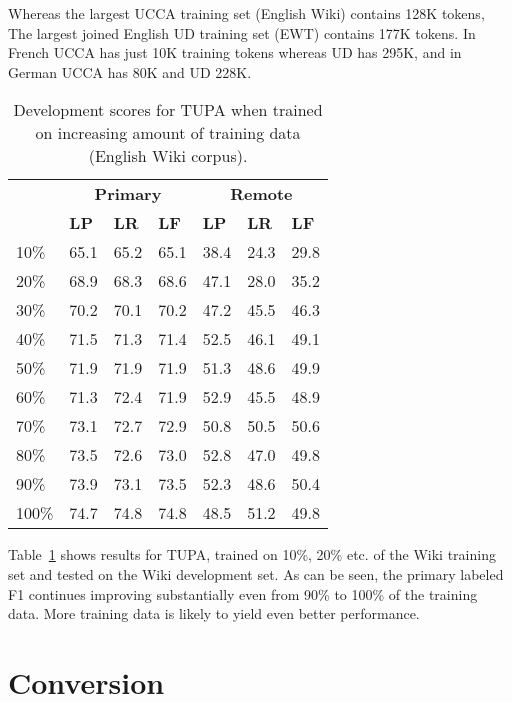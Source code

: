 \documentclass[11pt,a4paper]{article}
\begin{document}
Whereas the largest UCCA training set (English Wiki) contains 128K tokens,
The largest joined English UD training set (EWT) contains 177K tokens.
In French UCCA has just 10K training tokens whereas UD has 295K,
and in German UCCA has 80K and UD 228K.

\begin{table}[t]
\centering
\begin{tabular}{l|lll|lll}
& \multicolumn{3}{c|}{\footnotesize \bf Primary} & \multicolumn{3}{c}{\footnotesize \bf Remote} \\
& \footnotesize \textbf{LP} & \footnotesize \textbf{LR} & \footnotesize \textbf{LF}
& \footnotesize \textbf{LP} & \footnotesize \textbf{LR} & \footnotesize \textbf{LF} \\
\hline
\footnotesize 10\% & 65.1 & 65.2 & 65.1 & 38.4 & 24.3 & 29.8\\
\footnotesize 20\% & 68.9 & 68.3 & 68.6 & 47.1 & 28.0 & 35.2\\
\footnotesize 30\% & 70.2 & 70.1 & 70.2 & 47.2 & 45.5 & 46.3\\
\footnotesize 40\% & 71.5 & 71.3 & 71.4 & 52.5 & 46.1 & 49.1\\
\footnotesize 50\% & 71.9 & 71.9 & 71.9 & 51.3 & 48.6 & 49.9\\
\footnotesize 60\% & 71.3 & 72.4 & 71.9 & 52.9 & 45.5 & 48.9\\
\footnotesize 70\% & 73.1 & 72.7 & 72.9 & 50.8 & 50.5 & 50.6\\
\footnotesize 80\% & 73.5 & 72.6 & 73.0 & 52.8 & 47.0 & 49.8\\
\footnotesize 90\% & 73.9 & 73.1 & 73.5 & 52.3 & 48.6 & 50.4\\
\footnotesize 100\% & 74.7 & 74.8 & 74.8 & 48.5 & 51.2 & 49.8\\
\end{tabular}
\caption{
Development scores for TUPA \protect\cite{hershcovich2017a} when trained on increasing amount of training data
(English Wiki corpus).
\label{tab:partial_data_results}}
\end{table}

Table~\ref{tab:partial_data_results} shows results for TUPA,
trained on 10\%, 20\% etc. of the Wiki training set and tested on the Wiki development set.
As can be seen, the primary labeled F1 continues improving substantially even from 90\% to 100\%
of the training data. More training data is likely to yield even better performance.

\section{Conversion}\label{sec:conversion}
\end{document}
